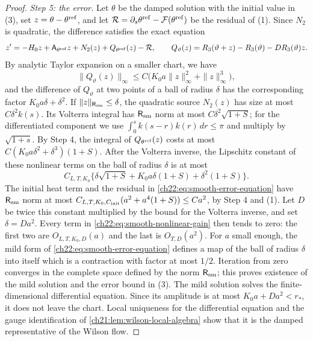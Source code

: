 \begin{proof}
\emph{Step 5: the error.} Let $\theta$ be the damped solution with the initial value in (3), set $z=\theta-\theta^{\rm ref}$, and let $\mathcal R=\partial_s\theta^{\rm ref}-\mathcal F(\theta^{\rm ref})$ be the residual of (1). Since $N_2$ is quadratic, the difference satisfies the exact equation
\begin{equation}\label{ch22:eq:smooth-error-equation}
 z'=-H_0z+\mathsf A_{\theta^{\rm ref}}z+N_2(z)+Q_{\theta^{\rm ref}}(z)-\mathcal R,
 \qquad
 Q_\vartheta(z)=R_3(\vartheta+z)-R_3(\vartheta)-DR_3(\vartheta)z .
\end{equation}
By analytic Taylor expansion on a smaller chart, we have
\[
 \|Q_\vartheta(z)\|_\infty\le C\bigl(K_0a\|z\|_\infty^2+\|z\|_\infty^3\bigr),
\]
and the difference of $Q_\vartheta$ at two points of a ball of radius $\delta$ has the corresponding factor $K_0a\delta+\delta^2$. If $\|z\|_{\mathsf R_{\rm sm}}\le\delta$, the quadratic source $N_2(z)$ has size at most $C\delta^2k(s)$. Its Volterra integral has $\mathsf R_{\rm sm}$ norm at most $C\delta^2\sqrt{1+S}$; for the differentiated component we use $\int_0^sk(s-r)k(r)\,dr\le\pi$ and multiply by $\sqrt{1+s}$. By Step 4, the integral of $Q_{\theta^{\rm ref}}(z)$ costs at most $C(K_0a\delta^2+\delta^3)(1+S)$. After the Volterra inverse, the Lipschitz constant of these nonlinear terms on the ball of radius $\delta$ is at most
\begin{equation}\label{ch22:eq:smooth-nonlinear-gain}
 C_{L,T,K_0}\bigl\{\delta\sqrt{1+S}+K_0a\delta(1+S)+\delta^2(1+S)\bigr\}.
\end{equation}
The initial heat term and the residual in \eqref{ch22:eq:smooth-error-equation} have $\mathsf R_{\rm sm}$ norm at most $C_{L,T,K_0,C_{\rm init}}(a^2+a^4(1+S))\le Ca^2$, by Step 4 and (1). Let $D$ be twice this constant multiplied by the bound for the Volterra inverse, and set $\delta=Da^2$. Every term in \eqref{ch22:eq:smooth-nonlinear-gain} then tends to zero: the first two are $O_{L,T,K_0,D}(a)$ and the last is $O_{T,D}(a^2)$. For $a$ small enough, the mild form of \eqref{ch22:eq:smooth-error-equation} defines a map of the ball of radius $\delta$ into itself which is a contraction with factor at most $1/2$. Iteration from zero converges in the complete space defined by the norm $\mathsf R_{\rm sm}$; this proves existence of the mild solution and the error bound in (3). The mild solution solves the finite-dimensional differential equation. Since its amplitude is at most $K_0a+Da^2<r_*$, it does not leave the chart. Local uniqueness for the differential equation and the gauge identification of \cref{ch21:lem:wilson-local-algebra} show that it is the damped representative of the Wilson flow.


\end{proof}
